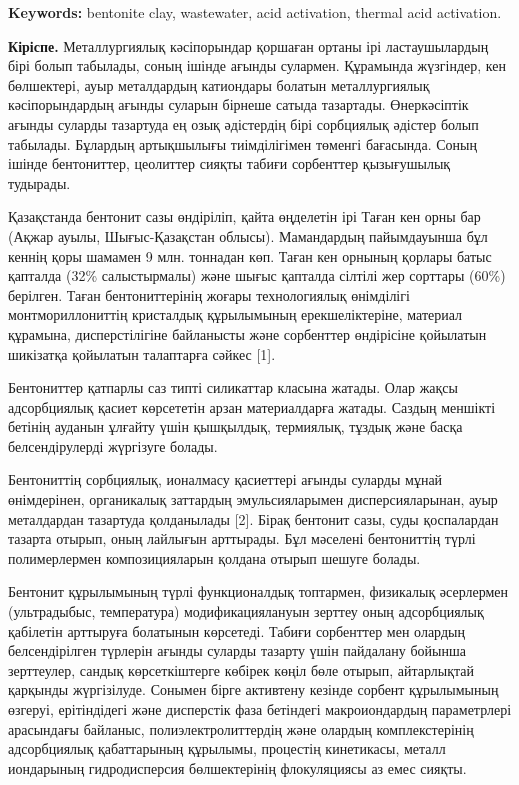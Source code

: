 {\bfseries Keywords:} bentonite clay, wastewater, acid activation, thermal
acid activation.

\begin{multicols}{2}
{\bfseries Кіріспе.} Металлургиялық кәсіпорындар қоршаған ортаны ірі
ластаушылардың бірі болып табылады, соның ішінде ағынды сулармен.
Құрамында жүзгіндер, кен бөлшектері, ауыр металдардың катиондары болатын
металлургиялық кәсіпорындардың ағынды суларын бірнеше сатыда тазартады.
Өнеркәсіптік ағынды суларды тазартуда ең озық әдістердің бірі сорбциялық
әдістер болып табылады. Бұлардың артықшылығы тиімділігімен төменгі
бағасында. Соның ішінде бентониттер, цеолиттер сияқты табиғи сорбенттер
қызығушылық тудырады.

Қазақстанда бентонит сазы өндіріліп, қайта өңделетін ірі Таған кен орны
бар (Ақжар ауылы, Шығыс-Қазақстан облысы). Мамандардың пайымдауынша бұл
кеннің қоры шамамен 9 млн. тоннадан көп. Таған кен орнының қорлары батыс
қапталда (32\% салыстырмалы) және шығыс қапталда сілтілі жер сорттары
(60\%) берілген. Таған бентониттерінің жоғары технологиялық өнімділігі
монтмориллониттің кристалдық құрылымының ерекшеліктеріне, материал
құрамына, дисперстілігіне байланысты және сорбенттер өндірісіне
қойылатын шикізатқа қойылатын талаптарға сәйкес {[}1{]}.

Бентониттер қатпарлы саз типті силикаттар класына жатады. Олар жақсы
адсорбциялық қасиет көрсететін арзан материалдарға жатады. Саздың
меншікті бетінің ауданын ұлғайту үшін қышқылдық, термиялық, тұздық және
басқа белсендірулерді жүргізуге болады.

Бентониттің сорбциялық, ионалмасу қасиеттері ағынды суларды мұнай
өнімдерінен, органикалық заттардың эмульсияларымен дисперсияларынан,
ауыр металдардан тазартуда қолданылады {[}2{]}. Бірақ бентонит сазы,
суды қоспалардан тазарта отырып, оның лайлығын арттырады. Бұл мәселені
бентониттің түрлі полимерлермен композицияларын қолдана отырып шешуге
болады.

Бентонит құрылымының түрлі функционалдық топтармен, физикалық әсерлермен
(ультрадыбыс, температура) модификациялануын зерттеу оның адсорбциялық
қабілетін арттыруға болатынын көрсетеді. Табиғи сорбенттер мен олардың
белсендірілген түрлерін ағынды суларды тазарту үшін пайдалану бойынша
зерттеулер, сандық көрсеткіштерге көбірек көңіл бөле отырып, айтарлықтай
қарқынды жүргізілуде. Сонымен бірге активтену кезінде сорбент
құрылымының өзгеруі, ерітіндідегі және дисперстік фаза бетіндегі
макроиондардың параметрлері арасындағы байланыс, полиэлектролиттердің
және олардың комплекстерінің адсорбциялық қабаттарының құрылымы,
процестің кинетикасы, металл иондарының гидродисперсия бөлшектерінің
флокуляциясы аз емес сияқты.


\end{multicols}

